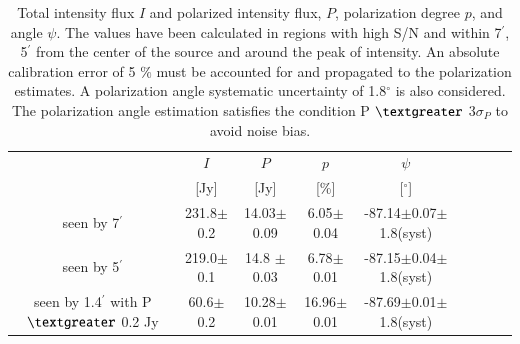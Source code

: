 \documentclass[twocolumn,traditabstract]{aa}
\begin{document}
\begin{table}
  \centering
      \begin{tabular}{ccccccccc}
      \hline
      \hline
       & $I$ & $P$ & $p$ & $\psi$  \\ 
                                         & [Jy]         &    [Jy]         & [\%]  & [$^\circ$] \\
      \hline
      \hline
   seen by 7$^{\prime}$   & 231.8$\pm$0.2  & 14.03$\pm$0.09 & 6.05$\pm$0.04 & -87.14$\pm$0.07$\pm$1.8(syst)  \\ 
 
          seen by 5$^{\prime}$ & 219.0$\pm$0.1  & 14.8 $\pm$0.03 & 6.78$\pm$0.01 & -87.15$\pm$0.04$\pm$1.8(syst)    \\ 
     	      
              seen by 1.4$^{\prime}$ with P $\textgreater$ 0.2 Jy& 60.6$\pm$0.2 & 10.28$\pm$0.01  & 16.96$\pm$0.01 &-87.69$\pm$0.01$\pm$1.8(syst)\\
              
             
                \hline            
    \hline   
    \end{tabular}
   \caption{ Total intensity flux $I$ and  polarized intensity flux, $P$, polarization degree $p$, and angle $\psi$. The values have been calculated in regions with high S/N and within 7$^{\prime}$, 5$^{\prime}$ from the center of the source and around the peak of intensity. An absolute calibration error of 5 $\%$ must be accounted for and propagated to the polarization estimates. A polarization angle systematic uncertainty of 1.8$^{\circ}$ is also considered.
   The polarization angle estimation satisfies the condition P $\textgreater$ 3$\sigma_P$ to avoid noise bias. 
    }
    \label{tab:crab_results}
 \end{table}
  
\end{document}
